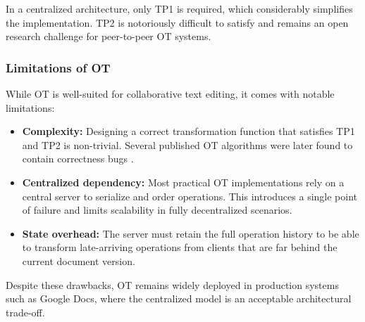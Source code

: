 In a centralized architecture, only TP1 is required, which considerably simplifies the implementation.
TP2 is notoriously difficult to satisfy and remains an open research challenge for peer-to-peer OT systems.

\subsubsection{Limitations of OT}

While OT is well-suited for collaborative text editing, it comes with notable limitations:

\begin{itemize}
    \item \textbf{Complexity:} Designing a correct transformation function that satisfies TP1 and TP2 is
    non-trivial. Several published OT algorithms were later found to contain correctness bugs
    \cite{ellis1989concurrency}.
    \item \textbf{Centralized dependency:} Most practical OT implementations rely on a central server
    to serialize and order operations. This introduces a single point of failure and limits scalability
    in fully decentralized scenarios.
    \item \textbf{State overhead:} The server must retain the full operation history to be able to
    transform late-arriving operations from clients that are far behind the current document version.
\end{itemize}

Despite these drawbacks, OT remains widely deployed in production systems such as Google Docs,
where the centralized model is an acceptable architectural trade-off.


